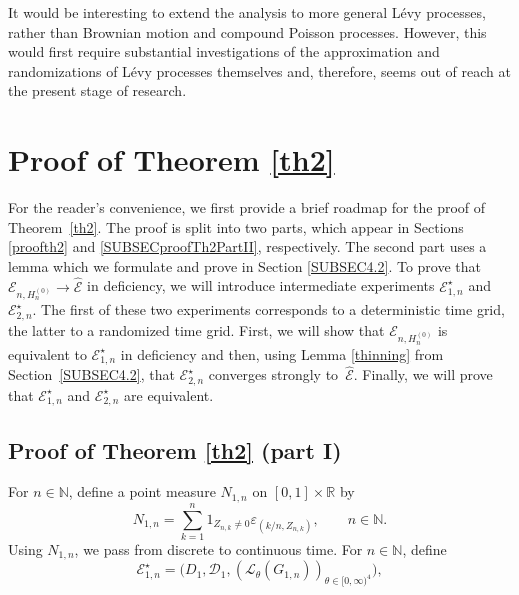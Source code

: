 \documentclass[number,citesort,seceqn,dvips]{arxbj}
\newcommand{\RR}{\mathbb{R}}
\newcommand{\NN}{\mathbb{N}}
\newcommand{\DDD}{{\mathcal D}}
\newcommand{\EEE}{{\mathcal E}}
\newcommand{\LLL}{{\mathcal L}}
\begin{document}
It would be interesting to extend the analysis to more general L\'{e}vy
processes, rather than Brownian motion and compound Poisson processes.
However, this would first require substantial investigations of the
approximation and randomizations of L\'{e}vy processes themselves and,
therefore, seems out of reach at the present stage of research.

%
\vspace*{-3.5pt}\section{\texorpdfstring{Proof of Theorem \protect\ref{th2}}
{Proof of Theorem 2.1}}\vspace*{-3.5pt}\label{proofA}
For the reader's convenience, we first provide a brief roadmap for the
proof of Theorem~\ref{th2}. The proof is split into two parts, which
appear in Sections \ref{proofth2} and \ref{SUBSECproofTh2PartII},
respectively. The second part uses a lemma which we formulate and
prove in Section \ref{SUBSEC4.2}. To prove that $\EEE_{n,H_n^{(0)}}
\to
\hat{\EEE}$ in deficiency, we will introduce intermediate experiments
$\EEE^{\star}_{1,n}$ and $\EEE^{\star}_{2,n}$. The first of\vspace*{1pt} these two
experiments corresponds to a deterministic time grid, the latter to a
randomized time grid. First, we will show that $\EEE_{n,H_n^{(0)}}$ is
equivalent to $\EEE^{\star}_{1,n}$ in deficiency and then, using Lemma
\ref{thinning} from Section~\ref{SUBSEC4.2}, that $\EEE^{\star}_{2,n}$ converges
strongly to~$\widehat\EEE$. Finally, we will prove that
$\EEE^{\star}_{1,n}$ and $\EEE^{\star}_{2,n}$ are equivalent.
%
\vspace*{-3.5pt}\subsection{\texorpdfstring{Proof of Theorem \protect\ref{th2} (part I)}
{Proof of Theorem 2.1 (part I)}}\vspace*{-3.5pt}\label{proofth2}
For $n\in\NN$, define a point measure $N_{1,n}$ on $[0,1]\times\RR$ by
%
\begin{equation}\label{defNn}
N_{1,n}=\sum_{k=1}^n 1_{Z_{n,k}\neq
0}  \varepsilon_{(k/n , Z_{n,k})},\qquad  n\in\NN .
\end{equation}
%
Using $N_{1,n}$, we pass from discrete to continuous time. For
$n\in\NN$, define
%
\[
\EEE^{\star}_{1,n}=\bigl(D_1,\DDD_1,(\LLL_\theta(G_{1,n}))_{\theta
\in[0,\infty)^4}\bigr),
\]
\end{document}
